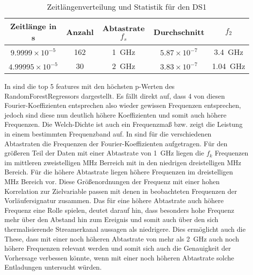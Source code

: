 \begin{table}[h!]
\centering
\begin{tabular}{|c|c|c|c|c|}
\hline
\textbf{Zeitlänge in s} & \textbf{Anzahl} & \textbf{Abtastrate} $f_s$ & \textbf{Durchschnitt} & \(f_2\)\\
\hline
$9.9999 \times 10^{-5}$  & 162 & \SI{1}{\giga\hertz} & $5.87 \times 10^{-7}$ & \SI{3,4}{\giga\hertz}\\
$4.99995 \times 10^{-5}$ & 30  & \SI{2}{\giga\hertz} & $3.83 \times 10^{-7}$ & \SI{1,04}{\giga\hertz}\\
\hline
\end{tabular}
\caption{Zeitlängenverteilung und Statistik für den DS1}
\label{tab:ds1-sample}
\end{table}

In  sind die top 5 features mit den höchsten p-Werten des RandomForestRegressors dargestellt. Es fällt direkt auf, dass 4 von diesen Fourier-Koeffizienten entsprechen also wieder gewissen Frequenzen entsprechen, jedoch sind diese nun deutlich höhere Koeffizienten und somit auch höhere Frequenzen. Die Welch-Dichte ist auch ein Frequenzmaß bzw. zeigt die Leistung in einem bestimmten Frequenzband auf. In  sind für die verschiedenen Abtastraten die Frequenzen der Fourier-Koeffizienten aufgetragen. Für den größeren Teil der Daten mit einer Abtastrate von \SI{1}{\giga\hertz} liegen die \(f_k\) Frequenzen im mittleren zweistelligen MHz Berreich mit in den niedrigen dreistelligen MHz Bereich. Für die höhere Abtastrate liegen höhere Frequenzen im dreistelligen MHz Bereich vor. Diese Größenordnungen der Frequenz mit einer hohen Korrelation zur Zielvariable passen mit denen in  beobachteten Frequenzen der Vorläufersignatur zusammen. Das für eine höhere Abtastrate auch höhere Frequenz eine Rolle spielen, deutet darauf hin, dass besonders hohe Frequenz mehr über den Abstand hin zum Ereignis und somit auch über den sich thermalisierende Streamerkanal aussagen als niedrigere. Dies ermöglicht auch die These, dass mit einer noch höheren Abtastrate von mehr als \SI{2}{\giga\hertz} auch noch höhere Frequenzen relevant werden und somit sich auch die Genauigkeit der Vorhersage verbessen könnte, wenn mit einer noch höheren Abtastrate solche Entladungen untersucht würden. 

